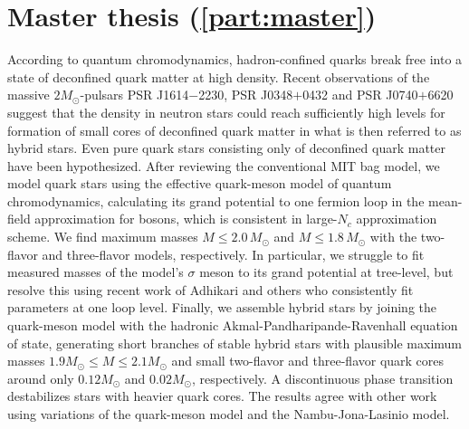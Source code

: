 \section*{Master thesis (\cref{part:master})}

According to quantum chromodynamics,
hadron-confined quarks break free into a state of deconfined quark matter at high density.
Recent observations of the massive $2 M_\odot$-pulsars PSR J1614$-$2230, PSR J0348$+$0432 and PSR J0740$+$6620
suggest that the density in neutron stars could reach sufficiently high levels
for formation of small cores of deconfined quark matter in what is then referred to as hybrid stars.
Even pure quark stars consisting only of deconfined quark matter have been hypothesized.
After reviewing the conventional MIT bag model,
we model quark stars using the effective quark-meson model of quantum chromodynamics,
calculating its grand potential to one fermion loop in the mean-field approximation for bosons,
which is consistent in large-$N_c$ approximation scheme.
We find maximum masses $M \leq 2.0 \, M_\odot$ and $M \leq 1.8 \, M_\odot$ with the two-flavor and three-flavor models, respectively.
In particular, we struggle to fit measured masses 
of the model's $\sigma$ meson to its grand potential at tree-level,
but resolve this using recent work of Adhikari and others who consistently fit parameters at one loop level.
Finally, we assemble hybrid stars by joining the quark-meson model with the hadronic Akmal-Pandharipande-Ravenhall equation of state,
generating short branches of stable hybrid stars with plausible maximum masses $1.9 M_\odot \leq M \leq 2.1 M_\odot$
and small two-flavor and three-flavor quark cores around only $0.12 M_\odot$ and $0.02 M_\odot$, respectively.
A discontinuous phase transition destabilizes stars with heavier quark cores.
The results agree with other work using variations of the quark-meson model and the Nambu-Jona-Lasinio model.
